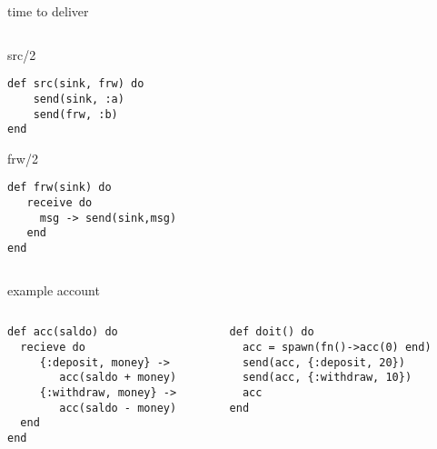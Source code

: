 \begin{frame}[fragile]{time to deliver}

\begin{columns}
   \begin{column}{.4\linewidth}
     \begin{block}{src/2}
\begin{verbatim}
def src(sink, frw) do
    send(sink, :a)
    send(frw, :b)
end
\end{verbatim}
      \end{block}
     \begin{block}{frw/2}
\begin{verbatim}
def frw(sink) do
   receive do
     msg -> send(sink,msg)
   end
end
\end{verbatim}
      \end{block}
    \end{column}
\pause
    \begin{column}{.6\linewidth}
    \end{column}

  \end{columns}


\end{frame}
 
\begin{frame}[fragile]{example account}

\begin{columns}
   \begin{column}{.5\linewidth}
     \begin{verbatim}
def acc(saldo) do
  recieve do
     {:deposit, money} ->
        acc(saldo + money)
     {:withdraw, money} ->
        acc(saldo - money)
  end
end
     \end{verbatim}
   \end{column}
\pause
  \begin{column}{.5\linewidth}
     \begin{verbatim}
def doit() do
  acc = spawn(fn()->acc(0) end)
  send(acc, {:deposit, 20})
  send(acc, {:withdraw, 10})
  acc
end
     \end{verbatim}
   \end{column}
\end{columns}


\end{frame}

